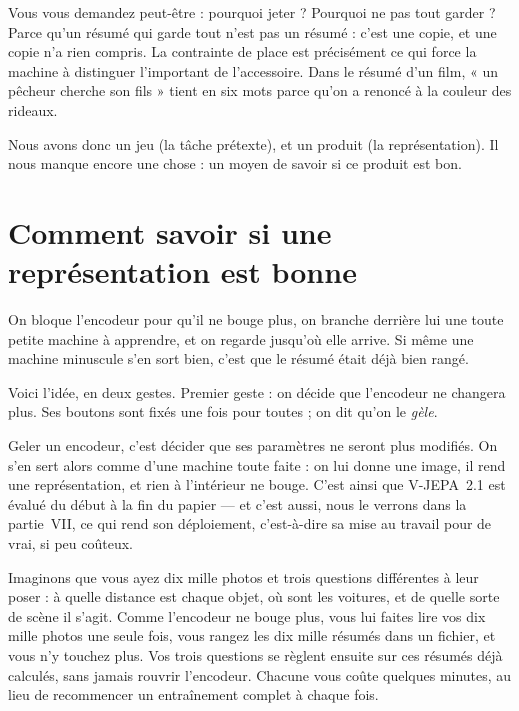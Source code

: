 \begin{remarque}
Vous vous demandez peut-être : pourquoi jeter ? Pourquoi ne pas tout garder ?
Parce qu'un résumé qui garde tout n'est pas un résumé : c'est une copie, et
une copie n'a rien compris. La contrainte de place est précisément ce qui
force la machine à distinguer l'important de l'accessoire. Dans le résumé
d'un film, « un pêcheur cherche son fils » tient en six mots parce qu'on a
renoncé à la couleur des rideaux.
\end{remarque}

Nous avons donc un jeu (la tâche prétexte), et un produit (la représentation).
Il nous manque encore une chose : un moyen de savoir si ce produit est bon.

\section{Comment savoir si une représentation est bonne}

\begin{enclair}
On bloque l'encodeur pour qu'il ne bouge plus, on branche derrière lui une
toute petite machine à apprendre, et on regarde jusqu'où elle arrive. Si
même une machine minuscule s'en sort bien, c'est que le résumé était déjà
bien rangé.
\end{enclair}

Voici l'idée, en deux gestes. Premier geste : on décide que l'encodeur ne
changera plus. Ses boutons sont fixés une fois pour toutes ; on dit qu'on le
\emph{gèle}.

\begin{definition}
Geler un encodeur, c'est décider que ses paramètres ne seront plus modifiés.
On s'en sert alors comme d'une machine toute faite : on lui donne une image,
il rend une représentation, et rien à l'intérieur ne bouge. C'est ainsi que
V-JEPA~2.1 est évalué du début à la fin du papier — et c'est aussi, nous le
verrons dans la partie~VII, ce qui rend son déploiement, c'est-à-dire sa mise
au travail pour de vrai, si peu coûteux.
\end{definition}

\begin{exemple}
Imaginons que vous ayez dix mille photos et trois questions différentes à
leur poser : à quelle distance est chaque objet, où sont les voitures, et de
quelle sorte de scène il s'agit. Comme l'encodeur ne bouge plus, vous lui
faites lire vos dix mille photos une seule fois, vous rangez les dix mille
résumés dans un fichier, et vous n'y touchez plus. Vos trois questions se
règlent ensuite sur ces résumés déjà calculés, sans jamais rouvrir
l'encodeur. Chacune vous coûte quelques minutes, au lieu de recommencer un
entraînement complet à chaque fois.
\end{exemple}

